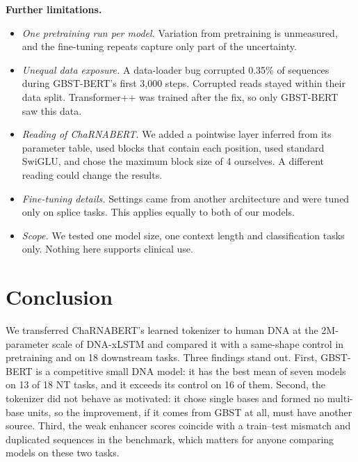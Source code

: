 \documentclass{article}
\begin{document}
\textbf{Further limitations.}
\begin{itemize}
  \item \emph{One pretraining run per model.} Variation from pretraining is unmeasured, and the
  fine-tuning repeats capture only part of the uncertainty.
  \item \emph{Unequal data exposure.} A data-loader bug corrupted 0.35\% of sequences during GBST-BERT's
  first 3,000 steps. Corrupted reads stayed within their data split. Transformer++ was trained after the
  fix, so only GBST-BERT saw this data.
  \item \emph{Reading of ChaRNABERT.} We added a pointwise layer inferred from its parameter table, used
  blocks that contain each position, used standard SwiGLU, and chose the maximum block size of 4
  ourselves. A different reading could change the results.
  \item \emph{Fine-tuning details.} Settings came from another architecture and were tuned only on splice
  tasks. This applies equally to both of our models.
  \item \emph{Scope.} We tested one model size, one context length and classification tasks only.
  Nothing here supports clinical use.
\end{itemize}

\section{Conclusion}

We transferred ChaRNABERT's learned tokenizer to human DNA at the 2M-parameter scale of DNA-xLSTM and
compared it with a same-shape control in pretraining and on 18 downstream tasks. Three findings stand
out. First, GBST-BERT is a competitive small DNA model: it has the best mean of seven models on 13 of 18
NT tasks, and it exceeds its control on 16 of them. Second, the tokenizer did not
behave as motivated: it chose single bases and formed no multi-base units, so the improvement, if it
comes from GBST at all, must have another source. Third, the weak enhancer scores coincide with a
train--test mismatch and duplicated sequences in the benchmark, which matters for anyone comparing
models on these two tasks.
\end{document}
